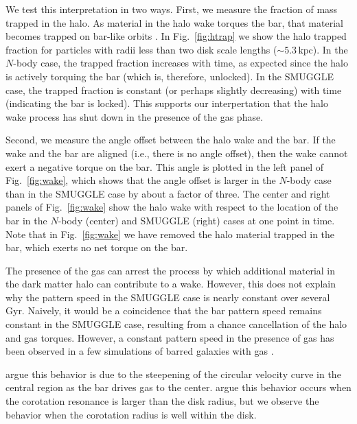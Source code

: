 \documentclass[twocolumn,linenumbers,trackchanges]{aastex631}
\newcommand{\Nbody}{$N$-body}
\newcommand{\SMUGGLE}{SMUGGLE}
\begin{document}
We test this interpretation in two ways. First, we measure the fraction of
mass trapped in the halo. As material in the halo wake torques the bar, that
material becomes trapped on bar-like orbits \citep[the ``shadow
bar'';][]{2016MNRAS.463.1952P}. In Fig.~\ref{fig:htrap} we show the halo trapped
fraction for particles with radii less than two disk scale lengths
($\sim5.3\,\textrm{kpc}$). In the \Nbody{} case, the trapped fraction increases
with time, as expected since the halo is actively torquing the bar (which is,
therefore, unlocked). In the \SMUGGLE{} case, the trapped fraction is constant
(or perhaps slightly decreasing) with time (indicating the bar is locked). This
supports our interpertation that the halo wake process has shut down in the
presence of the gas phase.

Second, we measure the angle offset between the halo wake and the bar. If the
wake and the bar are aligned (i.e., there is no angle offset), then the wake
cannot exert a negative torque on the bar. This angle is plotted in the left
panel of Fig.~\ref{fig:wake}, which shows that the angle offset is larger in the
\Nbody{} case than in the \SMUGGLE{} case by about a factor of three. The
center and right panels of Fig.~\ref{fig:wake} show the halo wake with respect
to the location of the bar in the \Nbody{} (center) and \SMUGGLE{} (right) cases
at one point in time. Note that in Fig.~\ref{fig:wake} we have removed the
halo material trapped in the bar, which exerts no net torque on the bar.

The presence of the gas can arrest the process by which additional material in
the dark matter halo can contribute to a wake. However, this does not explain
why the pattern speed in the \SMUGGLE{} case is nearly constant over several
Gyr. Naively, it would be a coincidence that the bar pattern speed remains
constant in the \SMUGGLE{} case, resulting from a chance cancellation of the
halo and gas torques. However, a constant pattern speed in the presence of gas
has been observed in a few simulations of barred galaxies with gas
\citep{1993AA...268...65F, 2007ApJ...666..189B, 2009ApJ...707..218V,
2010ApJ...719.1470V, 2014MNRAS.438L..81A}.

\citet{1993AA...268...65F} argue this behavior is due to the steepening of the
circular velocity curve in the central region as the bar drives gas to the
center. \citet{2009ApJ...707..218V} argue this behavior occurs when the
corotation resonance is larger than the disk radius, but we observe the behavior
when the corotation radius is well within the disk.
\end{document}
